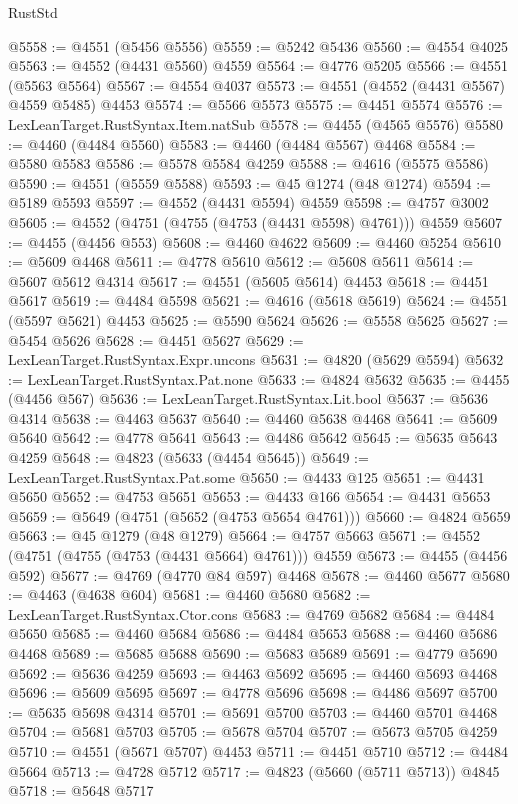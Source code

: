 \begin{lexlean}{RustStd}
\begin{coremodule}
@5558 := @4551 (@5456 @5556)
@5559 := @5242 @5436
@5560 := @4554 @4025
@5563 := @4552 (@4431 @5560) @4559
@5564 := @4776 @5205
@5566 := @4551 (@5563 @5564)
@5567 := @4554 @4037
@5573 := @4551 (@4552 (@4431 @5567) @4559 @5485) @4453
@5574 := @5566 @5573
@5575 := @4451 @5574
@5576 := LexLeanTarget.RustSyntax.Item.natSub
@5578 := @4455 (@4565 @5576)
@5580 := @4460 (@4484 @5560)
@5583 := @4460 (@4484 @5567) @4468
@5584 := @5580 @5583
@5586 := @5578 @5584 @4259
@5588 := @4616 (@5575 @5586)
@5590 := @4551 (@5559 @5588)
@5593 := @45 @1274 (@48 @1274)
@5594 := @5189 @5593
@5597 := @4552 (@4431 @5594) @4559
@5598 := @4757 @3002
@5605 := @4552 (@4751 (@4755 (@4753 (@4431 @5598) @4761))) @4559
@5607 := @4455 (@4456 @553)
@5608 := @4460 @4622
@5609 := @4460 @5254
@5610 := @5609 @4468
@5611 := @4778 @5610
@5612 := @5608 @5611
@5614 := @5607 @5612 @4314
@5617 := @4551 (@5605 @5614) @4453
@5618 := @4451 @5617
@5619 := @4484 @5598
@5621 := @4616 (@5618 @5619)
@5624 := @4551 (@5597 @5621) @4453
@5625 := @5590 @5624
@5626 := @5558 @5625
@5627 := @5454 @5626
@5628 := @4451 @5627
@5629 := LexLeanTarget.RustSyntax.Expr.uncons
@5631 := @4820 (@5629 @5594)
@5632 := LexLeanTarget.RustSyntax.Pat.none
@5633 := @4824 @5632
@5635 := @4455 (@4456 @567)
@5636 := LexLeanTarget.RustSyntax.Lit.bool
@5637 := @5636 @4314
@5638 := @4463 @5637
@5640 := @4460 @5638 @4468
@5641 := @5609 @5640
@5642 := @4778 @5641
@5643 := @4486 @5642
@5645 := @5635 @5643 @4259
@5648 := @4823 (@5633 (@4454 @5645))
@5649 := LexLeanTarget.RustSyntax.Pat.some
@5650 := @4433 @125
@5651 := @4431 @5650
@5652 := @4753 @5651
@5653 := @4433 @166
@5654 := @4431 @5653
@5659 := @5649 (@4751 (@5652 (@4753 @5654 @4761)))
@5660 := @4824 @5659
@5663 := @45 @1279 (@48 @1279)
@5664 := @4757 @5663
@5671 := @4552 (@4751 (@4755 (@4753 (@4431 @5664) @4761))) @4559
@5673 := @4455 (@4456 @592)
@5677 := @4769 (@4770 @84 @597) @4468
@5678 := @4460 @5677
@5680 := @4463 (@4638 @604)
@5681 := @4460 @5680
@5682 := LexLeanTarget.RustSyntax.Ctor.cons
@5683 := @4769 @5682
@5684 := @4484 @5650
@5685 := @4460 @5684
@5686 := @4484 @5653
@5688 := @4460 @5686 @4468
@5689 := @5685 @5688
@5690 := @5683 @5689
@5691 := @4779 @5690
@5692 := @5636 @4259
@5693 := @4463 @5692
@5695 := @4460 @5693 @4468
@5696 := @5609 @5695
@5697 := @4778 @5696
@5698 := @4486 @5697
@5700 := @5635 @5698 @4314
@5701 := @5691 @5700
@5703 := @4460 @5701 @4468
@5704 := @5681 @5703
@5705 := @5678 @5704
@5707 := @5673 @5705 @4259
@5710 := @4551 (@5671 @5707) @4453
@5711 := @4451 @5710
@5712 := @4484 @5664
@5713 := @4728 @5712
@5717 := @4823 (@5660 (@5711 @5713)) @4845
@5718 := @5648 @5717

\end{coremodule}
\end{lexlean}
